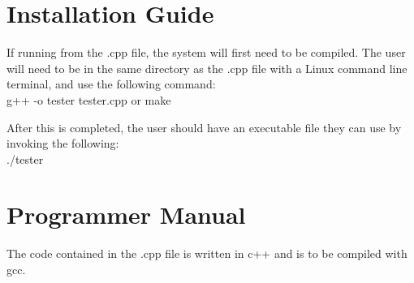 \section{Installation Guide}
If running from the .cpp file, the system will first need to be compiled. The user will need to be in the 
same directory as the .cpp file with a Linux command line terminal, and use the following command: \\
g++ -o tester tester.cpp or make

After this is completed, the user should have an
executable file they can use by invoking the following: \\
./tester


\section{Programmer Manual}
The code contained in the .cpp file is written in c++ and is to be compiled with gcc. 


